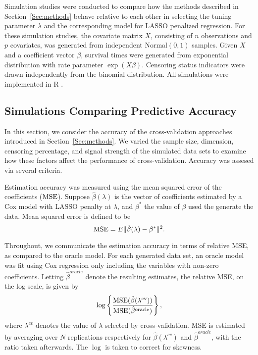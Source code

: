 Simulation studies were conducted to compare how the methods described in Section~\ref{Sec:methods} behave relative to each other in selecting the tuning parameter $\lambda$ and the corresponding model for LASSO penalized regression. For these simulation studies, the covariate matrix $X$, consisting of $n$ observations and $p$ covariates, was generated from independent $\text{Normal}(0, 1)$ samples. Given $X$ and a coefficient vector $\beta$, survival times were generated from exponential distribution with rate parameter $\exp(X\beta)$. Censoring status indicators were drawn independently from the binomial distribution. All simulations were implemented in R \citep{R}. 
   
\subsection {Simulations Comparing Predictive Accuracy}
\label{Sec:accuracy}

In this section, we consider the accuracy of the cross-validation approaches introduced in Section~\ref{Sec:methods}. We varied the sample size, dimension, censoring percentage, and signal strength of the simulated data sets to examine how these factors affect the performance of cross-validation. Accuracy was assesed via several criteria.

Estimation accuracy was measured using the mean squared error of the coefficients ($\textrm{MSE}$). Suppose $\hat{\beta}(\lambda)$ is the vector of coefficients estimated by a Cox model with LASSO penalty at $\lambda$, and $\beta^*$ the value of $\beta$ used the generate the data. Mean squared error is defined to be 
\begin{equation}
\textrm{MSE} = E\| \hat{\beta}(\lambda) - \beta^* \| ^2.
\end{equation}

Throughout, we communicate the estimation accuracy in terms of relative MSE, as compared to the oracle model.  For each generated data set, an oracle model was fit using Cox regression only including the variables with non-zero coefficients. Letting $\hat{\beta}^{oracle}$ denote the resulting estimates, the relative MSE, on the log scale, is given by
\begin{equation}
\log\left\{ \frac{\textrm{MSE}(\hat{\beta}(\lambda^{\text{cv}}))}{\textrm{MSE}(\hat{\beta}^{\text{oracle}})} \right\},
\end{equation}
where $\lambda^{cv}$ denotes the value of $\lambda$ selected by cross-validation. MSE is estimated by averaging over $N$ replications respectively for $\hat{\beta}(\lambda^{cv})$ and $\hat{\beta}^{oracle}$, with the ratio taken afterwards. The $\log$ is taken to correct for skewness.

